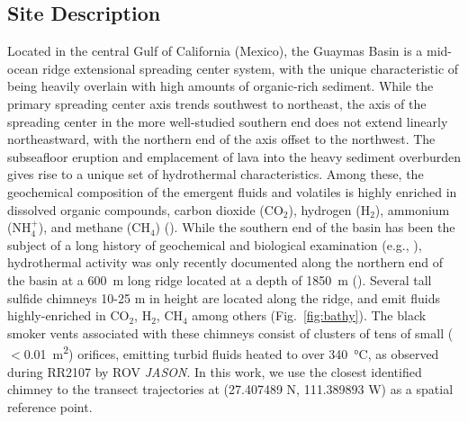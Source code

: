 \subsection{Site Description}
Located in the central Gulf of California (Mexico), the Guaymas Basin is a mid-ocean ridge extensional spreading center system, with the unique characteristic of being heavily overlain with high amounts of organic-rich sediment. While the primary spreading center axis trends southwest to northeast, the axis of the spreading center in the more well-studied southern end does not extend linearly northeastward, with the northern end of the axis offset to the northwest. The subseafloor eruption and emplacement of lava into the heavy sediment overburden gives rise to a unique set of hydrothermal characteristics. Among these, the geochemical composition of the emergent fluids and volatiles is highly enriched in dissolved organic compounds, carbon dioxide (CO$_2$), hydrogen (H$_2$), ammonium (NH$_{4}^{+}$), and methane (CH$_4$) (\cite{seewald1994variations, von1985chemistry}). While the southern end of the basin has been the subject of a long history of geochemical and biological examination (e.g., \cite{ondreas2018recent, teske2016guaymas, seewald1994variations, von1985chemistry, lonsdale1985hydrothermal}), hydrothermal activity was only recently documented along the northern end of the basin at a \SI{600}{\meter} long ridge located at a depth of \SI{1850}{\meter} (\cite{soule2018exploration, geilert2018formation}). Several tall sulfide chimneys 10-25 m in height are located along the ridge, and emit fluids highly-enriched in CO$_2$, H$_2$, CH$_4$ among others (Fig.~\ref{fig:bathy}). The black smoker vents associated with these chimneys consist of clusters of tens of small ($<$\SI{0.01}{\meter\squared}) orifices, emitting turbid fluids heated to over \SI{340}{\celsius}, as observed during RR2107 by ROV \emph{JASON}. In this work, we use the closest identified chimney to the transect trajectories at (27.407489 N, 111.389893 W) as a spatial reference point.


